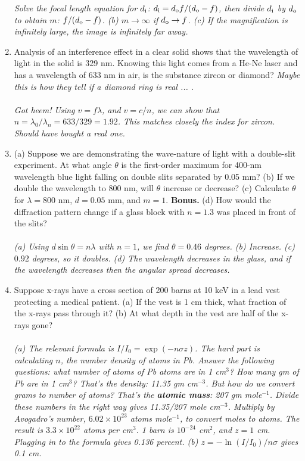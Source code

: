 \documentclass[12pt,twocolumn]{article}
\begin{document}
\begin{enumerate}
\textit{Solve the focal length equation for $d_{\rm i}$: $d_{\rm i} = d_{\rm o}f/(d_{\rm o} - f)$, then divide $d_{\rm i}$ by $d_{\rm o}$ to obtain $m$: $f/(d_{\rm o} - f)$.  (b) $m \to \infty$ if $d_{\rm o} \to f$. (c) If the magnification is infinitely large, the image is infinitely far away.}
\item Analysis of an interference effect in a clear solid shows that the wavelength of light in the solid is 329 nm. Knowing this light comes from a He-Ne laser and has a wavelength of 633 nm in air, is the substance zircon or diamond? \textit{Maybe this is how they tell if a diamond ring is real ... .}\\ \\
\textit{Got heem!  Using $v = f\lambda$, and $v = c/n$, we can show that $n = \lambda_0/\lambda_n = 633/329 = 1.92$.  This matches closely the index for zircon.  Should have bought a real one.}
\item (a) Suppose we are demonstrating the wave-nature of light with a double-slit experiment.  At what angle $\theta$ is the first-order maximum for 400-nm wavelength blue light falling on double slits separated by 0.05 mm? (b) If we double the wavelength to 800 nm, will $\theta$ increase or decrease? (c) Calculate $\theta$ for $\lambda = 800$ nm, $d = 0.05$ mm, and $m = 1$.  \textbf{Bonus.} (d) How would the diffraction pattern change if a glass block with $n = 1.3$ was placed in front of the slits? \\ \\
\textit{(a) Using $d\sin\theta = n\lambda$ with $n = 1$, we find $\theta = 0.46$ degrees. (b) Increase. (c) $0.92$ degrees, so it doubles. (d) The wavelength decreases in the glass, and if the wavelength decreases then the angular spread decreases.}
\item Suppose x-rays have a cross section of 200 barns at 10 keV in a lead vest protecting a medical patient. (a) If the vest is 1 cm thick, what fraction of the x-rays pass through it? (b) At what depth in the vest are half of the x-rays gone? \\ \\
\textit{(a) The relevant formula is $I/I_0 = \exp(-n\sigma z)$.  The hard part is calculating $n$, the number density of atoms in Pb.  Answer the following questions: what number of atoms of Pb atoms are in 1 cm$^3$?  How many gm of Pb are in 1 cm$^3$?  That's the density: 11.35 gm cm$^{-3}$.  But how do we convert grams to number of atoms?  That's the \textbf{atomic mass}: 207 gm mole$^{-1}$.  Divide these numbers in the right way gives 11.35/207 mole cm$^{-3}$.  Multiply by Avogadro's number, $6.02 \times 10^{23}$ atoms mole$^{-1}$, to convert moles to atoms.  The result is $3.3 \times 10^{22}$ atoms per cm$^3$.  1 barn is $10^{-24}$ cm$^2$, and $z = 1$ cm.  Plugging in to the formula gives 0.136 percent. (b) $z = -\ln(I/I_0)/n\sigma$ gives 0.1 cm.}

\end{enumerate}
\end{document}
